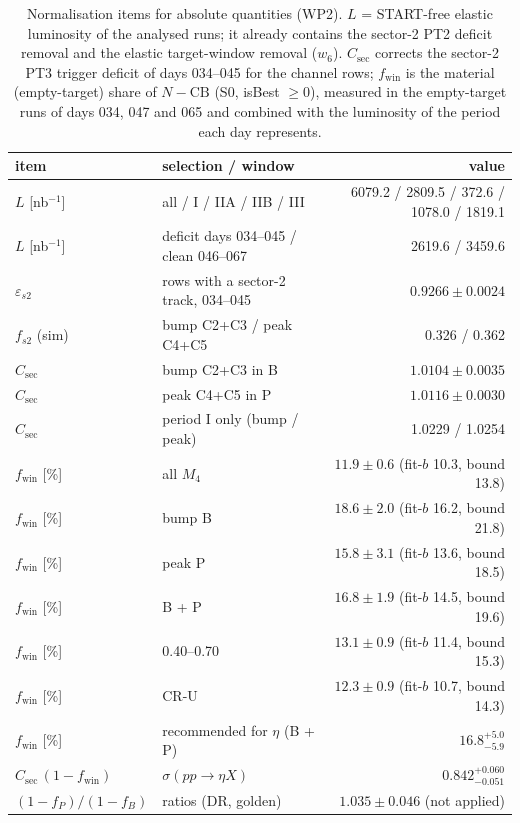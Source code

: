 \begin{table}[htbp]\centering\small
\caption{Normalisation items for absolute quantities (WP2). $L$ = START-free elastic luminosity of the analysed runs; it already contains the sector-2 PT2 deficit removal and the elastic target-window removal ($w_6$). $C_\mathrm{sec}$ corrects the sector-2 PT3 trigger deficit of days 034--045 for the channel rows; $f_\mathrm{win}$ is the material (empty-target) share of $N-\mathrm{CB}$ (S0, isBest $\geq 0$), measured in the empty-target runs of days 034, 047 and 065 and combined with the luminosity of the period each day represents.}
\label{tab:N1}
\begin{tabular}{llr}
\toprule
item & selection / window & value \\
\midrule
$L$ [nb$^{-1}$] & all / I / IIA / IIB / III & 6079.2 / 2809.5 / 372.6 / 1078.0 / 1819.1 \\
$L$ [nb$^{-1}$] & deficit days 034--045 / clean 046--067 & 2619.6 / 3459.6 \\
$\varepsilon_{s2}$ & rows with a sector-2 track, 034--045 & $0.9266 \pm 0.0024$ \\
$f_{s2}$ (sim) & bump C2+C3 / peak C4+C5 & 0.326 / 0.362 \\
$C_\mathrm{sec}$ & bump C2+C3 in B & $1.0104 \pm 0.0035$ \\
$C_\mathrm{sec}$ & peak C4+C5 in P & $1.0116 \pm 0.0030$ \\
$C_\mathrm{sec}$ & period I only (bump / peak) & 1.0229 / 1.0254 \\
\midrule
$f_\mathrm{win}$ [\%] & all $M_4$ & $11.9 \pm 0.6$ (fit-$b$ 10.3, bound 13.8) \\
$f_\mathrm{win}$ [\%] & bump B & $18.6 \pm 2.0$ (fit-$b$ 16.2, bound 21.8) \\
$f_\mathrm{win}$ [\%] & peak P & $15.8 \pm 3.1$ (fit-$b$ 13.6, bound 18.5) \\
$f_\mathrm{win}$ [\%] & B + P & $16.8 \pm 1.9$ (fit-$b$ 14.5, bound 19.6) \\
$f_\mathrm{win}$ [\%] & 0.40--0.70 & $13.1 \pm 0.9$ (fit-$b$ 11.4, bound 15.3) \\
$f_\mathrm{win}$ [\%] & CR-U & $12.3 \pm 0.9$ (fit-$b$ 10.7, bound 14.3) \\
$f_\mathrm{win}$ [\%] & recommended for $\eta$ (B + P) & $16.8^{+5.0}_{-5.9}$ \\
$C_\mathrm{sec}\,(1-f_\mathrm{win})$ & $\sigma(pp\to\eta X)$ & $0.842^{+0.060}_{-0.051}$ \\
$(1-f_P)/(1-f_B)$ & ratios (DR, golden) & $1.035 \pm 0.046$ (not applied) \\
\bottomrule
\end{tabular}
\end{table}
